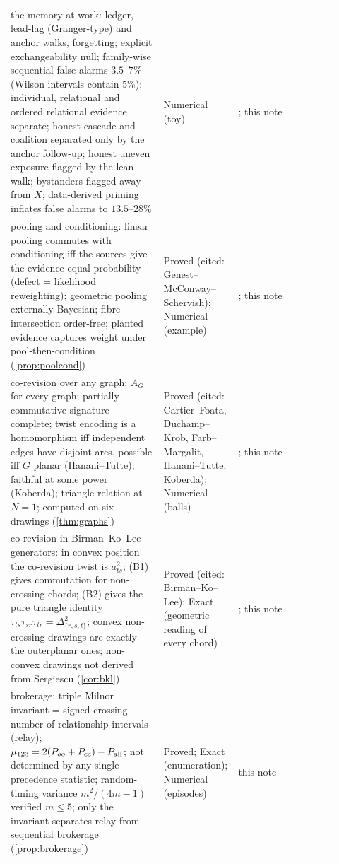 \documentclass[11pt]{article}
\theoremstyle{definition}\newtheorem{definition}[theorem]{Definition}\newtheorem{remark}[theorem]{Remark}\newtheorem{example}[theorem]{Example}\newtheorem{problem}[theorem]{Open problem}\crefname{problem}{Problem}{Problems}
\begin{document}
{\begin{longtable}{p{0.46\linewidth}p{0.16\linewidth}p{0.3\linewidth}}
\rowcolor{stNew} the memory at work: ledger, lead-lag (Granger-type) and anchor walks, forgetting; explicit exchangeability null; family-wise sequential false alarms $3.5$--$7\%$ (Wilson intervals contain $5\%$); individual, relational and ordered relational evidence separate; honest cascade and coalition separated only by the anchor follow-up; honest uneven exposure flagged by the lean walk; bystanders flagged away from $X$; data-derived priming inflates false alarms to $13.5$--$28\%$ & Numerical (toy) & \cite{Granger1969,Wilson1927}; this note\\
\rowcolor{stNew} pooling and conditioning: linear pooling commutes with conditioning iff the sources give the evidence equal probability (defect = likelihood reweighting); geometric pooling externally Bayesian; fibre intersection order-free; planted evidence captures weight under pool-then-condition (\cref{prop:poolcond}) & Proved (cited: Genest--McConway--Schervish); Numerical (example) & \cite{Stone1961,GenestZidek1986,GenestMcConwaySchervish1986}; this note\\
\rowcolor{stNew} co-revision over any graph: $A_G$ for every graph; partially commutative signature complete; twist encoding is a homomorphism iff independent edges have disjoint arcs, possible iff $G$ planar (Hanani--Tutte); faithful at some power (Koberda); triangle relation at $N=1$; computed on six drawings (\cref{thm:graphs}) & Proved (cited: Cartier--Foata, Duchamp--Krob, Farb--Margalit, Hanani--Tutte, Koberda); Numerical (balls) & \cite{Tutte1970,PelsmajerSchaeferStefankovic2007,FarbMargalit2012,Koberda2012,CrispParis2001}; this note\\
\rowcolor{stNew} co-revision in Birman--Ko--Lee generators: in convex position the co-revision twist is $a_{ts}^2$; (B1) gives commutation for non-crossing chords; (B2) gives the pure triangle identity $\tau_{ts}\tau_{sr}\tau_{tr}=\Delta^2_{\{r,s,t\}}$; convex non-crossing drawings are exactly the outerplanar ones; non-convex drawings not derived from Sergiescu (\cref{cor:bkl}) & Proved (cited: Birman--Ko--Lee); Exact (geometric reading of every chord) & \cite{BirmanKoLee1998,Sergiescu1993}; this note\\
\rowcolor{stNew} brokerage: triple Milnor invariant = signed crossing number of relationship intervals (relay); $\mu_{123}=2(P_{oo}+P_{cc})-P_{\rm all}$; not determined by any single precedence statistic; random-timing variance $m^2/(4m-1)$ verified $m\le5$; only the invariant separates relay from sequential brokerage (\cref{prop:brokerage}) & Proved; Exact (enumeration); Numerical (episodes) & this note\\

\end{longtable}}
\end{document}

